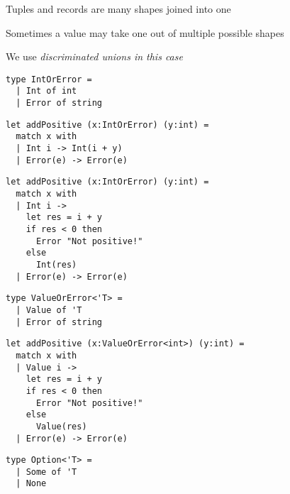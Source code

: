\documentclass{beamer}
\begin{document}
\begin{slide}{
\item Tuples and records are many shapes joined into one
\item Sometimes a value may take one out of multiple possible shapes
\item We use \textit{discriminated unions in this case}
}\end{slide}

\begin{frame}[fragile]
\begin{lstlisting}
type IntOrError = 
  | Int of int
  | Error of string
\end{lstlisting}
\end{frame}

\begin{frame}[fragile]
\begin{lstlisting}
let addPositive (x:IntOrError) (y:int) =
  match x with 
  | Int i -> Int(i + y)
  | Error(e) -> Error(e)
\end{lstlisting}
\end{frame}

\begin{frame}[fragile]
\begin{lstlisting}
let addPositive (x:IntOrError) (y:int) =
  match x with 
  | Int i -> 
    let res = i + y
    if res < 0 then
      Error "Not positive!"
    else
      Int(res)
  | Error(e) -> Error(e)
\end{lstlisting}
\end{frame}

\begin{frame}[fragile]
\begin{lstlisting}
type ValueOrError<'T> = 
  | Value of 'T
  | Error of string
\end{lstlisting}
\end{frame}

\begin{frame}[fragile]
\begin{lstlisting}
let addPositive (x:ValueOrError<int>) (y:int) =
  match x with 
  | Value i -> 
    let res = i + y
    if res < 0 then
      Error "Not positive!"
    else
      Value(res)
  | Error(e) -> Error(e)
\end{lstlisting}
\end{frame}

\begin{frame}[fragile]
\begin{lstlisting}
type Option<'T> = 
  | Some of 'T
  | None
\end{lstlisting}
\end{frame}
\end{document}
